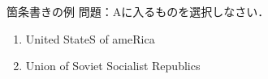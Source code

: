 \begin{frame}{箇条書きの例}
    問題：Aに入るものを選択しなさい．

    \begin{enumerate}
        \item United StateS of ameRica
        \item Union of Soviet Socialist Republics
    \end{enumerate}
\end{frame}
